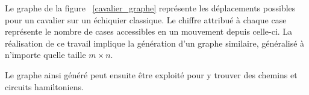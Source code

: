 Le graphe de la figure ~\ref{cavalier_graphe} représente les déplacements possibles pour un cavalier sur un échiquier classique. Le chiffre attribué à chaque case représente le nombre de cases accessibles en un mouvement depuis celle-ci. La réalisation de ce travail implique la génération d'un graphe similaire, généralisé à n'importe quelle taille $m \times n$. 

Le graphe ainsi généré peut ensuite être exploité pour y trouver des chemins et circuits hamiltoniens.

